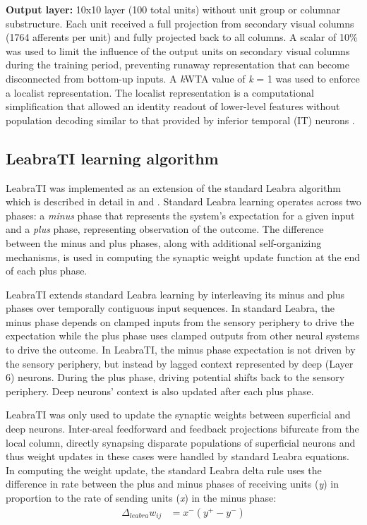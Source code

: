 \documentclass[dwyatte_dissertation.tex]{subfiles}
\begin{document}
\textbf{Output layer:} 10x10 layer (100 total units) without unit group or columnar substructure. Each unit received a full projection from secondary visual columns (1764 afferents per unit) and fully projected back to all columns. A scalar of 10\% was used to limit the influence of the output units on secondary visual columns during the training period, preventing runaway representation that can become disconnected from bottom-up inputs. A \textit{k}WTA value of \textit{k} = 1 was used to enforce a localist representation. The localist representation is a computational simplification that allowed an identity readout of lower-level features without population decoding similar to that provided by inferior temporal (IT) neurons  \cite{HungKreimanPoggioEtAl05,LiCoxZoccolanEtAl09}. 

\subsection{LeabraTI learning algorithm}

LeabraTI was implemented as an extension of the standard Leabra algorithm which is described in detail in  and . Standard Leabra learning operates across two phases: a \textit{minus} phase that represents the system's expectation for a given input and a \textit{plus} phase, representing observation of the outcome. The difference between the minus and plus phases, along with additional self-organizing mechanisms, is used in computing the synaptic weight update function at the end of each plus phase. 

LeabraTI extends standard Leabra learning by interleaving its minus and plus phases over temporally contiguous input sequences. In standard Leabra, the minus phase depends on clamped inputs from the sensory periphery to drive the expectation while the plus phase uses clamped outputs from other neural systems to drive the outcome. In LeabraTI, the minus phase expectation is not driven by the sensory periphery, but instead by lagged context represented by deep (Layer 6) neurons. During the plus phase, driving potential shifts back to the sensory periphery. Deep neurons' context is also updated after each plus phase.

LeabraTI was only used to update the synaptic weights between superficial and deep neurons. Inter-areal feedforward and feedback projections bifurcate from the local column, directly synapsing disparate populations of superficial neurons and thus weight updates in these cases were handled by standard Leabra equations. In computing the weight update, the standard Leabra delta rule \cite{OReilly96} uses the difference in rate between the plus and minus phases of receiving units (\textit{y}) in proportion to the rate of sending units (\textit{x}) in the minus phase:
\begin{align*}
\Delta_{leabra} w_{ij} &= x^-(y^+ - y^-)
\end{align*}
\end{document}
